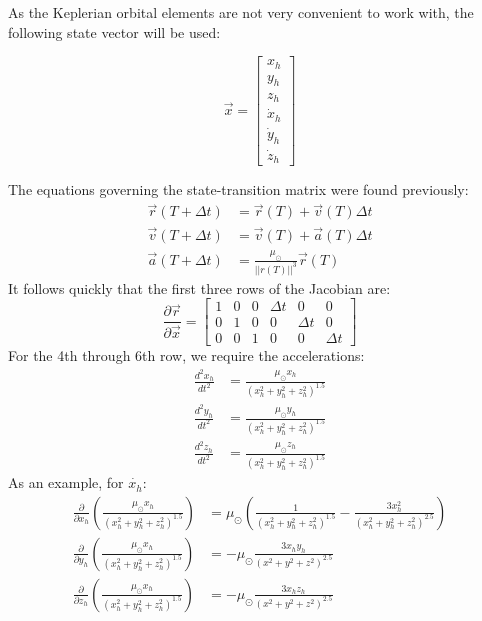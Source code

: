 \documentclass[a4paper,10pt]{article}
\begin{document}
As the Keplerian orbital elements are not very convenient to work with, the following state vector will be used:

\begin{equation}
 \vec{x} = \begin{bmatrix} x_h \\ y_h \\ z_h \\ \dot{x}_h \\ \dot{y}_h \\ \dot{z}_h \end{bmatrix}
\end{equation}

The equations governing the state-transition matrix were found previously:
\begin{align}
 \vec{r}(T+\Delta t) &= \vec{r}(T) + \vec{v}(T)\Delta t \\
 \vec{v}(T+\Delta t) &= \vec{v}(T) + \vec{a}(T)\Delta t \\
 \vec{a}(T+\Delta t) &= \frac{\mu_\odot}{||r(T)||^3}\vec{r}(T)
\end{align}
It follows quickly that the first three rows of the Jacobian are:
\begin{equation}
 \frac{\partial \vec{r}}{\partial \vec{x}} = 
 \begin{bmatrix}
  1 & 0 & 0 & \Delta t & 0 & 0 \\
  0 & 1 & 0 & 0 & \Delta t & 0 \\
  0 & 0 & 1 & 0 & 0 & \Delta t
 \end{bmatrix}
\end{equation}
For the 4th through 6th row, we require the accelerations:
\begin{align}
 \frac{d^2 x_h}{dt^2} &= \frac{\mu_\odot x_h}{\left(x_h^2 + y_h^2 + z_h^2\right)^{1.5}} \\
 \frac{d^2 y_h}{dt^2} &= \frac{\mu_\odot y_h}{\left(x_h^2 + y_h^2 + z_h^2\right)^{1.5}} \\
 \frac{d^2 z_h}{dt^2} &= \frac{\mu_\odot z_h}{\left(x_h^2 + y_h^2 + z_h^2\right)^{1.5}}
\end{align}
As an example, for $\dot{x_h}$:
\begin{align}
 \frac{\partial}{\partial x_h} \left(\frac{\mu_\odot x_h}{\left(x_h^2 + y_h^2 + z_h^2\right)^{1.5}}\right) &=
 \mu_\odot \left(\frac{1}{\left(x_h^2 + y_h^2 + z_h^2\right)^{1.5}} - \frac{3x_h^2}{\left(x_h^2 + y_h^2 + z_h^2\right)^{2.5}}\right) \\
 \frac{\partial}{\partial y_h} \left(\frac{\mu_\odot x_h}{\left(x_h^2 + y_h^2 + z_h^2\right)^{1.5}}\right) &=
 -\mu_\odot\frac{3 x_h y_h}{\left(x^2 + y^2 + z^2\right)^{2.5}} \\
 \frac{\partial}{\partial z_h} \left(\frac{\mu_\odot x_h}{\left(x_h^2 + y_h^2 + z_h^2\right)^{1.5}}\right) &=
 -\mu_\odot\frac{3 x_h z_h}{\left(x^2 + y^2 + z^2\right)^{2.5}} \\
\end{align}
\end{document}
